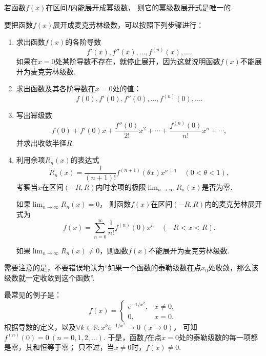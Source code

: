 \begin{theorem}
若函数\(f(x)\)在区间\(I\)内能展开成幂级数，
则它的幂级数展开式是唯一的.
\end{theorem}

{\color{red}
要把函数\(f(x)\)展开成麦克劳林级数，可以按照下列步骤进行：
\begin{enumerate}
	\item 求出函数\(f(x)\)的各阶导数\[
		f'(x),f''(x),\dotsc,f^{(n)}(x),\dotsc.
	\]
	如果在\(x=0\)处某阶导数不存在，就停止展开，因为这就说明函数\(f(x)\)不能展开为麦克劳林级数.

	\item 求出函数及其各阶导数在\(x=0\)处的值：\[
		f(0),f'(0),f''(0),\dotsc,f^{(n)}(0),\dotsc.
	\]

	\item 写出幂级数\[
		f(0) + f'(0) x + \frac{f''(0)}{2!} x^2 + \dotsb + \frac{f^{(n)}(0)}{n!} x^n + \dotsb,
	\]
	并求出收敛半径\(R\).

	\item 利用余项\(R_n(x)\)的表达式\[
		R_n(x) = \frac{1}{(n+1)!} f^{(n+1)}(\theta x) x^{n+1}
		\quad(0 < \theta < 1),
	\]
	考察当\(x\)在区间\((-R,R)\)内时余项的极限\(\lim_{n\to\infty} R_n(x)\)是否为零.

	如果\(\lim_{n\to\infty} R_n(x) = 0\)，
	则函数\(f(x)\)在区间\((-R,R)\)内的麦克劳林展开式为\[
		f(x) = \sum_{n=0}^\infty \frac{1}{n!} f^{(n)}(0) x^n
		\quad(-R < x < R).
	\]

	如果\(\lim_{n\to\infty} R_n(x) \neq 0\)，则函数\(f(x)\)不能展开为麦克劳林级数.
\end{enumerate}
}

需要注意的是，不要错误地认为“如果一个函数的泰勒级数在点\(x_0\)处收敛，那么该级数就一定收敛到这个函数”.
\begin{example}\label{example:无穷级数.函数的泰勒级数不一定收敛到函数}
最常见的例子是：\[
	f(x) = \left\{ \begin{array}{ll}
		e^{-1/x^2}, & x\neq0, \\
		0, & x=0.
	\end{array} \right.
\]
根据导数的定义，以及\(\forall k\in\mathbb{R}: x^k e^{-1/x^2} \to 0\ (x\to0)\)，
可知\(f^{(n)}(0) = 0\ (n=0,1,2,\dotsc)\).
于是，函数\(f\)在点\(x=0\)处的泰勒级数的每一项都是零，其和恒等于零；
只不过，当\(x\neq0\)时，\(f(x)\neq0\).
\end{example}


